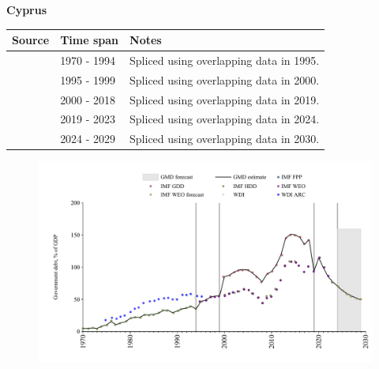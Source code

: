 \documentclass[12pt,a4paper,landscape]{article}
\begin{document}
\begin{adjustbox}{max totalsize={\paperwidth}{\paperheight},center}
\begin{minipage}[t][\textheight][t]{\textwidth}
\vspace*{0.5cm}
{}
\begin{center}
{\Large\bfseries Cyprus}
\end{center}
\vspace{0.5cm}
\begin{table}[H]
\centering
\small
\begin{tabular}{|l|l|l|}
\hline
\textbf{Source} & \textbf{Time span} & \textbf{Notes} \\
\hline
\rowcolor{white}\cite{IMF_HDD}& 1970 - 1994 &Spliced using overlapping data in 1995.\\
\rowcolor{lightgray}\cite{IMF_FPP}& 1995 - 1999 &Spliced using overlapping data in 2000.\\
\rowcolor{white}\cite{IMF_GDD}& 2000 - 2018 &Spliced using overlapping data in 2019.\\
\rowcolor{lightgray}\cite{IMF_FPP}& 2019 - 2023 &Spliced using overlapping data in 2024.\\
\rowcolor{white}\cite{IMF_WEO_forecast}& 2024 - 2029 &Spliced using overlapping data in 2030.\\
\hline
\end{tabular}
\end{table}
\begin{figure}[H]
\centering
\includegraphics[width=\textwidth,height=0.6\textheight,keepaspectratio]{graphs/CYP_govdebt_GDP.pdf}
\end{figure}
\end{minipage}
\end{adjustbox}
\end{document}

